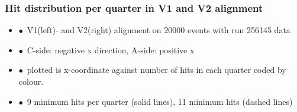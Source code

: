 \documentclass[aspectratio=1610, 12pt]{beamer}
\begin{document}
\begin{frame}\frametitle{Hit distribution per quarter in V1 and V2 alignment}
  \begin{itemize}
    \item $\bullet$\, V1(left)- and V2(right) alignment on 20000 events with run 256145 data
    \item $\bullet$\, C-side: negative x direction, A-side: positive x
    \item $\bullet$\, plotted is x-coordinate against number of hits in each quarter coded by colour.
    \item $\bullet$\, 9 minimum hits per quarter (solid lines), 11 minimum hits (dashed lines)
  \end{itemize}
  \begin{figure}
  \end{figure}
\end{frame}
\end{document}
